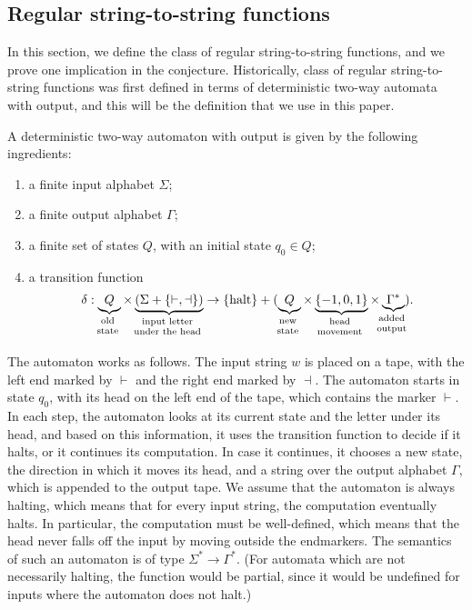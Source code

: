 
\subsection{Regular string-to-string functions}
\label{sec:regular-string-to-string-functions}

In this section, we define the class of regular string-to-string functions, and we prove one implication in the conjecture. 
 Historically, class of regular string-to-string  functions was first defined in terms of 
 deterministic two-way automata with output\cite[Note 4]{shepherdson1959reduction}, and this will be the definition that we use in this paper.

 \begin{definition}
    A deterministic two-way automaton with output is given by the following ingredients:
    \begin{enumerate}
        \item a finite input alphabet $\Sigma$;
        \item a finite output alphabet $\Gamma$;
        \item a finite set of states $Q$, with an initial state $q_0 \in Q$;
        \item a transition function  
        \begin{align*}
        \delta : 
        \myunderbrace{Q}{old \\ state} \times 
        \myunderbrace{(\Sigma + \{\vdash, \dashv\})}{input letter\\ under  the head} \to  \set{\text{halt}} + (
        \myunderbrace{Q}{new \\ state}
         \times 
         \myunderbrace{\{-1,0,1\}}{head \\ movement} \times 
         \myunderbrace{\Gamma^*}{added \\ output}) .
        \end{align*}
    \end{enumerate}
 \end{definition}

    The automaton works as follows. The input string $w$ is placed on a tape, with the left end marked by $\vdash$ and the right end marked by $\dashv$. The automaton starts in state $q_0$, with its head on the left end of the tape, which contains the marker $\vdash$. In each step, the automaton looks at its current state and the letter under its head, and based on this information, it uses the transition function to decide if it halts, or it continues its computation. In case it continues, it chooses a  new state, the direction in which it moves its head, and a string over the output alphabet $\Gamma$, which is appended to the output tape. We assume that the automaton is always halting, which means that for every input string, the computation eventually halts. In particular, the computation must be well-defined, which means that the head never falls off the input by moving outside the endmarkers.   The semantics of such an automaton is of type $\Sigma^* \to \Gamma^*$. (For automata which are not necessarily halting, the function would be partial, since it would be undefined for inputs where the automaton does not halt.)

